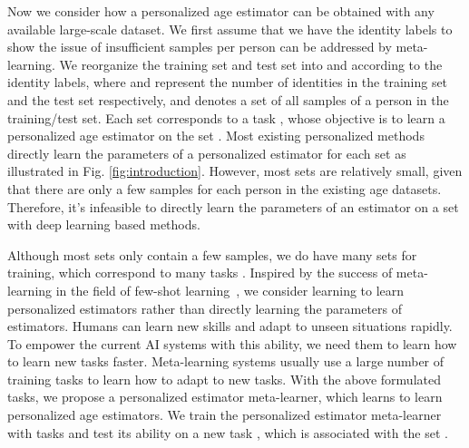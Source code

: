\documentclass[journal,twoside]{IEEEtran}
\begin{document}
Now we consider how a personalized age estimator  can be obtained with any available large-scale dataset. We first assume that we have the identity labels to show the issue of insufficient samples per person can be addressed by meta-learning. We reorganize the training set and test set into  and  according to the identity labels, where  and  represent the number of identities in the training set and the test set respectively, and  denotes a set of all samples of a person in the training/test set. Each set  corresponds to a task , whose objective is to learn a personalized age estimator on the set . Most existing personalized methods directly learn the parameters of a personalized estimator for each set  as illustrated in Fig. \ref{fig:introduction}. 
However, most sets  are relatively small, given that there are only a few samples for each person in the existing age datasets.
Therefore, it's infeasible to directly learn the parameters of an estimator on a set  with deep learning based methods.


Although most sets  only contain a few samples, we do have many sets  for training, which correspond to many tasks . Inspired by the success of meta-learning in the field of few-shot learning~\cite{finn2017model}, we consider learning to learn personalized estimators rather than directly learning the parameters of estimators. Humans can learn new skills and adapt to unseen situations rapidly. To empower the current AI systems with this ability, we need them to learn how to learn new tasks faster. Meta-learning systems usually use a large number of training tasks to learn how to adapt to new tasks. With the above formulated tasks, we propose a personalized estimator meta-learner, which learns to learn personalized age estimators. We train the personalized estimator meta-learner with tasks  and test its ability on a new task , which is associated with the set .
\end{document}
